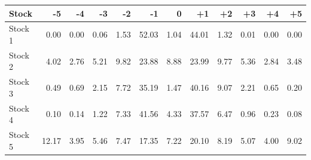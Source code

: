 \begin{tabular}{lrrrrrrrrrrr}
\toprule
Stock & -5 & -4 & -3 & -2 & -1 & 0 & +1 & +2 & +3 & +4 & +5 \\
\midrule
Stock 1 & 0.00 & 0.00 & 0.06 & 1.53 & 52.03 & 1.04 & 44.01 & 1.32 & 0.01 & 0.00 & 0.00 \\
Stock 2 & 4.02 & 2.76 & 5.21 & 9.82 & 23.88 & 8.88 & 23.99 & 9.77 & 5.36 & 2.84 & 3.48 \\
Stock 3 & 0.49 & 0.69 & 2.15 & 7.72 & 35.19 & 1.47 & 40.16 & 9.07 & 2.21 & 0.65 & 0.20 \\
Stock 4 & 0.10 & 0.14 & 1.22 & 7.33 & 41.56 & 4.33 & 37.57 & 6.47 & 0.96 & 0.23 & 0.08 \\
Stock 5 & 12.17 & 3.95 & 5.46 & 7.47 & 17.35 & 7.22 & 20.10 & 8.19 & 5.07 & 4.00 & 9.02 \\
\bottomrule
\end{tabular}
